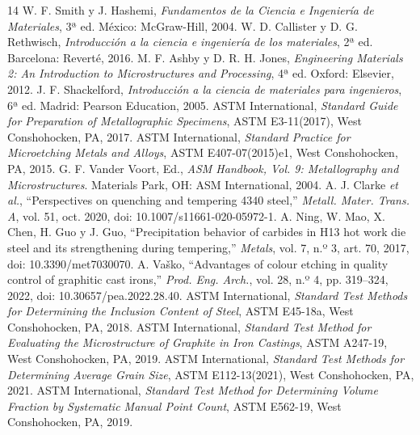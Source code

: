 \documentclass[journal,11pt]{IEEEtran}
\begin{document}
\begin{thebibliography}{14}
 W. F. Smith y J. Hashemi, \textit{Fundamentos de la Ciencia e Ingeniería de Materiales}, 3ª ed. México: McGraw-Hill, 2004.
 W. D. Callister y D. G. Rethwisch, \textit{Introducción a la ciencia e ingeniería de los materiales}, 2ª ed. Barcelona: Reverté, 2016.
 M. F. Ashby y D. R. H. Jones, \textit{Engineering Materials 2: An Introduction to Microstructures and Processing}, 4ª ed. Oxford: Elsevier, 2012.
 J. F. Shackelford, \textit{Introducción a la ciencia de materiales para ingenieros}, 6ª ed. Madrid: Pearson Education, 2005.
 ASTM International, \textit{Standard Guide for Preparation of Metallographic Specimens}, ASTM E3-11(2017), West Conshohocken, PA, 2017.
 ASTM International, \textit{Standard Practice for Microetching Metals and Alloys}, ASTM E407-07(2015)e1, West Conshohocken, PA, 2015.
 G. F. Vander Voort, Ed., \textit{ASM Handbook, Vol. 9: Metallography and Microstructures}. Materials Park, OH: ASM International, 2004.
 A. J. Clarke \textit{et al.}, ``Perspectives on quenching and tempering 4340 steel,'' \textit{Metall. Mater. Trans. A}, vol. 51, oct. 2020, doi: 10.1007/s11661-020-05972-1.
 A. Ning, W. Mao, X. Chen, H. Guo y J. Guo, ``Precipitation behavior of carbides in H13 hot work die steel and its strengthening during tempering,'' \textit{Metals}, vol. 7, n.º 3, art. 70, 2017, doi: 10.3390/met7030070.
 A. Vaško, ``Advantages of colour etching in quality control of graphitic cast irons,'' \textit{Prod. Eng. Arch.}, vol. 28, n.º 4, pp. 319--324, 2022, doi: 10.30657/pea.2022.28.40.
 ASTM International, \textit{Standard Test Methods for Determining the Inclusion Content of Steel}, ASTM E45-18a, West Conshohocken, PA, 2018.
 ASTM International, \textit{Standard Test Method for Evaluating the Microstructure of Graphite in Iron Castings}, ASTM A247-19, West Conshohocken, PA, 2019.
 ASTM International, \textit{Standard Test Methods for Determining Average Grain Size}, ASTM E112-13(2021), West Conshohocken, PA, 2021.
 ASTM International, \textit{Standard Test Method for Determining Volume Fraction by Systematic Manual Point Count}, ASTM E562-19, West Conshohocken, PA, 2019.
\end{thebibliography}
\end{document}
